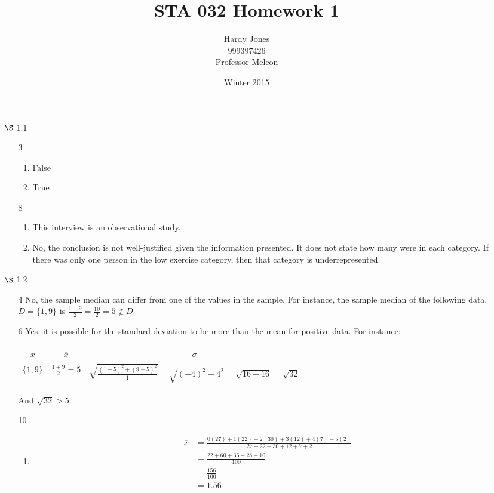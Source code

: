 \documentclass[12pt,letterpaper]{article}
\title{STA 032 Homework 1\vspace{-2ex}}
\author{Hardy Jones\\
        999397426\\
        Professor Melcon\vspace{-2ex}}
\date{Winter 2015}
\begin{document}
  \maketitle

  \begin{enumerate}
    \item [$\S$ 1.1]
      \begin{enumerate}
        \item [3]
          \begin{enumerate}[label=(\arabic*)]
            \item False
            \item True
          \end{enumerate}
        \item [8]
          \begin{enumerate}[label=(\arabic*)]
            \item This interview is an observational study.
            \item
              No, the conclusion is not well-justified given the information presented.
              It does not state how many were in each category.
              If there was only one person in the low exercise category,
              then that category is underrepresented.
          \end{enumerate}
      \end{enumerate}

    \item [$\S$ 1.2]
      \begin{enumerate}
        \item [4]
          No, the sample median can differ from one of the values in the sample.
          For instance, the sample median of the following data,
          $D = \{1, 9\}$
          is $\frac{1 + 9}{2} = \frac{10}{2} = 5 \notin D$.
        \item [6]
          Yes, it is possible for the standard deviation to be more than the mean for positive data.
          For instance:

          \begin{tabular}{c | c | c}
            $x$        & $\overline{x}$        & $\sigma$ \\
            \hline
            $\{1, 9\}$ & $\frac{1 + 9}{2} = 5$ & $\sqrt{\frac{(1-5)^2 + (9 - 5)^2}{1}} = \sqrt{(-4)^2 + 4^2} = \sqrt{16 + 16} = \sqrt{32}$
          \end{tabular}

          And $\sqrt{32} > 5$.
        \item [10]
          \begin{enumerate}[label=(\arabic*)]
            \item
              \begin{align*}
                \overline{x} &= \frac{0(27) + 1(22) + 2(30) + 3(12) + 4(7) + 5(2)}{27 + 22 + 30 + 12 + 7 + 2} \\
                &= \frac{22 + 60 + 36 + 28 + 10}{100} \\
                &= \frac{156}{100} \\
                &= 1.56
              \end{align*}


\end{enumerate}
\end{enumerate}
\end{enumerate}
\end{document}
